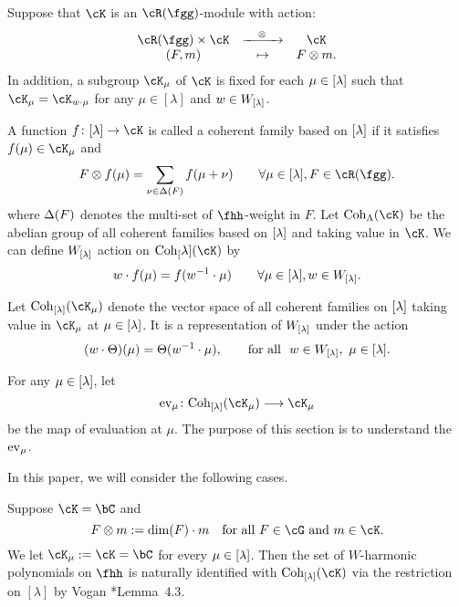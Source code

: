 \documentclass[counting_main.tex]{subfiles}
\begin{document}
\begin{defn}
  Suppose that $\cK$ is an $\Rg$-module with action:
  \[
    \begin{array}{ccc}
      \Rg \times \cK & \xrightarrow{\ \ \ \otimes \ \ \ } & \cK\\
      (F,m) & \mapsto & F\otimes m.
    \end{array}
  \]
  In addition, a subgroup $\cK_{\mu}$ of $\cK$ is fixed for each $\mu \in {[\lambda]}$
  such that $\cK_{\mu} = \cK_{w\cdot \mu}$ for any $\mu\in [\lambda]$ and
  $w\in W_{{[\lambda]}}$.

  A function $f\colon \Lam \rightarrow \cK$ is called a coherent family based on
  ${[\lambda]}$ if it satisfies $f(\mu)\in \cK_\mu$ and
  \[
    F\otimes f(\mu) = \sum_{\nu \in \WT{F}} f(\mu+\nu) \qquad \forall \mu\in \Lam, F\in \Rg.
  \]
  where $\Delta(F)$ denotes the multi-set of $\fhh$-weight in $F$. Let
  $\Coh_{\Lambda}(\cK)$ be the abelian group of all coherent families based on
  ${[\lambda]}$ and taking value in $\cK$. We can define $W_{{[\lambda]}}$ action on
  $\Coh_[\lambda](\cK)$ by
  \[
    w\cdot f(\mu) = f(w^{-1}\cdot \mu) \qquad \forall \mu\in {[\lambda]}, w\in W_{{[\lambda]}}.
  \]


  Let $\Coh_{\Lam}(\cK_{\mu})$ denote the vector space of all coherent families
  on ${[\lambda]}$ taking value in $\cK_{\mu}$ at $\mu\in {[\lambda]}$. It is a representation
  of $W_{{[\lambda]}}$ under the action
  \[
    (w\cdot \Theta)(\mu) = \Theta(w^{-1}\cdot \mu), \qquad \textrm{for all
    }\ w\in W_{[\lambda]}, \ \mu\in {[\lambda]}.
  \]
\end{defn}
For any $\mu\in {[\lambda]}$, let
\[
  \ev{\mu}\colon \Coh_{\Lam}(\cK_{\mu}) \longrightarrow \cK_{\mu}
\]
be the map of evaluation at $\mu$. The purpose of this section is to understand
the ${\mathrm{ev}_{\mu}}$.

In this paper, we will consider the following cases.
\begin{eg}
  Suppose $\cK=\bC$ and
  \[
    F\otimes m := \dim(F)\cdot m \quad \text{for all } F\in \cG \text{ and
    } m\in \cK.
  \]
  We let $\cK_{\mu} := \cK = \bC$ for every $\mu\in {[\lambda]}$. Then the set of
  $W$-harmonic polynomials on $\fhh$ is naturally identified with
  $\Coh_{\Lam}(\cK)$ via the restriction on $[\lambda]$ by Vogan
  \cite{VGK}*{Lemma~4.3}. 
\end{eg}
\end{document}
